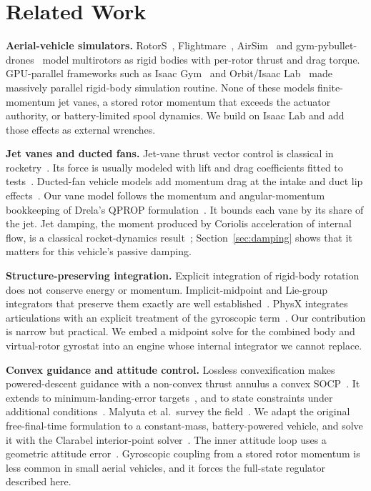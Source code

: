 \documentclass[journal]{IEEEtran}
\newcommand{\refsec}[1]{Section~\ref{#1}}
\begin{document}
\section{Related Work}
\label{sec:related}

\textbf{Aerial-vehicle simulators.}
RotorS~\cite{furrer2016rotors}, Flightmare~\cite{song2020flightmare}, AirSim~\cite{shah2018airsim} and gym-pybullet-drones~\cite{panerati2021gym} model multirotors as rigid bodies with per-rotor thrust and drag torque.
GPU-parallel frameworks such as Isaac Gym~\cite{makoviychuk2021isaac} and Orbit/Isaac Lab~\cite{mittal2023orbit} made massively parallel rigid-body simulation routine.
None of these models finite-momentum jet vanes, a stored rotor momentum that exceeds the actuator authority, or battery-limited spool dynamics.
We build on Isaac Lab and add those effects as external wrenches.

\textbf{Jet vanes and ducted fans.}
Jet-vane thrust vector control is classical in rocketry~\cite{sutton2017}.
Its force is usually modeled with lift and drag coefficients fitted to tests~\cite{luo2018jetvane}.
Ducted-fan vehicle models add momentum drag at the intake and duct lip effects~\cite{johnson2006ducted,pflimlin2010ducted}.
Our vane model follows the momentum and angular-momentum bookkeeping of Drela's QPROP formulation~\cite{drela2006qprop}.
It bounds each vane by its share of the jet.
Jet damping, the moment produced by Coriolis acceleration of internal flow, is a classical rocket-dynamics result~\cite{thomson1986}; \refsec{sec:damping} shows that it matters for this vehicle's passive damping.

\textbf{Structure-preserving integration.}
Explicit integration of rigid-body rotation does not conserve energy or momentum.
Implicit-midpoint and Lie-group integrators that preserve them exactly are well established~\cite{simo1991,hairer2006,lee2007lie}.
PhysX integrates articulations with an explicit treatment of the gyroscopic term~\cite{physx2023}.
Our contribution is narrow but practical.
We embed a midpoint solve for the combined body and virtual-rotor gyrostat into an engine whose internal integrator we cannot replace.

\textbf{Convex guidance and attitude control.}
Lossless convexification makes powered-descent guidance with a non-convex thrust annulus a convex SOCP~\cite{acikmese2007,acikmese2011lcvx}.
It extends to minimum-landing-error targets~\cite{blackmore2010mle}, and to state constraints under additional conditions~\cite{harris2014lcvx}.
Malyuta et al.\ survey the field~\cite{malyuta2022convex}.
We adapt the original free-final-time formulation to a constant-mass, battery-powered vehicle, and solve it with the Clarabel interior-point solver~\cite{goulart2024clarabel}.
The inner attitude loop uses a geometric attitude error~\cite{lee2010geometric}.
Gyroscopic coupling from a stored rotor momentum is less common in small aerial vehicles, and it forces the full-state regulator described here.
\end{document}
